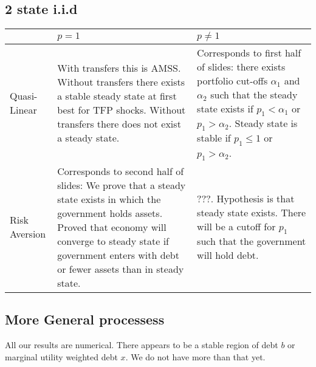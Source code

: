 \documentclass[12pt]{article}
\begin{document}
\section{}
\subsection{2 state i.i.d}
\begin{tabular}[h]{| l | p{2in} | p{2in} |}
	\hline
	&$p = 1$& $p\neq 1$\\
	\hline
	Quasi-Linear& With transfers this is AMSS.  Without transfers there exists a stable steady state at first best for TFP shocks.  Without transfers there does not exist a steady state.& Corresponds to first half of slides: there exists portfolio cut-offs $\alpha_1$ and $\alpha_2$ such that the steady state exists if $p_1 < \alpha_1$ or $p_1 >\alpha_2$.  Steady state is stable if $p_1 \leq 1$ or $p_1 >\alpha_2$.\\
	\hline
	Risk Aversion&Corresponds to second half of slides:  We prove that a steady state exists in which the government holds assets.  Proved that economy will converge to steady state if government enters with debt or fewer assets than in steady state.& ???.  Hypothesis is that steady state exists.  There will be a cutoff for $p_1$ such that the government will hold debt.\\
	\hline
\end{tabular}
\subsection{More General processess}
All our results are numerical.  There appears to be a stable region of debt $b$ or marginal utility weighted debt $x$.  We do not have more than that yet.
\end{document}

